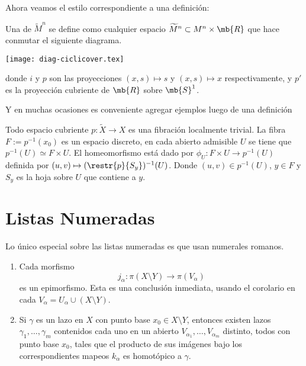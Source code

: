\documentclass[11pt, twoside]{book}
\begin{document}
\medskip

Ahora veamos el estilo correspondiente a una definición:

\begin{definicion}
  Una  de \(\widetilde{M}^n\) se define como cualquier espacio 
  \(\widetilde{M}^n \subset M^n \times \mb{R}\) que hace conmutar el siguiente
  diagrama.
  \begin{center}
    \texttt{[image: diag-ciclicover.tex]}
  \end{center}
  donde \(i\) y \(p\) son las proyecciones \( (x,s) \mapsto s\) y \((x,s)
  \mapsto x\) respectivamente, y \(p'\) es la proyección cubriente de 
  \(\mb{R}\) sobre \(\mb{S}^1\).
\end{definicion}

Y en muchas ocasiones es conveniente agregar ejemplos luego de una definición

\begin{ejemplo}
  Todo espacio cubriente \(p:\widetilde{X} \rightarrow X\) es una fibración 
  localmente trivial. La fibra \(F:=p^{-1}(x_0)\) es un espacio discreto, en
  cada abierto admisible \(U\) se tiene que \(p^{-1}(U) \simeq F \times U\).
  El homeomorfismo está dado por \(\phi_U:F \times U \rightarrow p^{-1}(U)\) 
  definida por \((u,v) \mapsto (\restr{p}{S_y})^{-1}(U)\). Donde \( (u,v) \in
  p^{-1}(U)\), \(y \in F\) y \(S_y\) es la hoja sobre \(U\) que contiene a  
  \(y\). 
\end{ejemplo}


\section{Listas Numeradas}

Lo único especial sobre las listas numeradas es que usan numerales romanos.

\begin{enumerate}
  \item Cada morfismo
    \[j_{\alpha} : \pi(X \setminus Y) \rightarrow \pi(V_{\alpha})\]
    es un epimorfismo. Esta es una conclusión inmediata, usando el corolario
    en cada \(V_{\alpha} = U_{\alpha} \cup (X
    \setminus Y)\).

  \item Si \(\gamma\) es un lazo en \(X\) con punto base \(x_0 \in X
    \setminus Y\), entonces existen lazos \(\gamma_1, \ldots, \gamma_m\)
    contenidos cada uno en un abierto \(V_{\alpha_1}, \ldots, V_{\alpha_m}\)
    distinto, todos con
    punto base \(x_0\), tales que el producto de sus imágenes bajo los
    correspondientes mapeos \(k_{\alpha}\) es homotópico a \(\gamma\). 
\end{enumerate}
\end{document}
